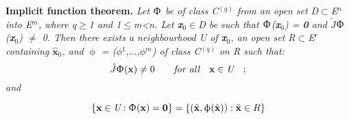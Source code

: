 \documentclass{article}
\theoremstyle{nonumberplain}
\begin{document}
\textbf{Implicit function theorem.} 
\emph{Let \textbf{$\Upphi$} be of class C$^{(q)}$ from an open set D$\subset$E$^n$ into E$^m$, where q$\geq$1 and 1$\leq$m\emph{<}n. Let \textbf{x}$_0$$\in$D be such that 
\textbf{$\Upphi$}\emph{(}\textbf{x}$_0$\emph{)}
\emph{=} \emph{\textbf{0}}
and 
$\tilde{J}$\textbf{$\Upphi$}\emph{(}\textbf{x}$_0$\emph{)}
\emph{$\neq$ 0}.
 Then there exists a neighbourhood U of \textbf{x}$_0$, an open set R$\subset$E$^r$
  containing $\widehat{\textbf{x}}$$_0$, 
  and }\textbf{$\upphi$} 
  \emph{\emph{= (}$\phi$$^1$,$\dotsc$,$\phi$$^m$\emph{)} of class C$^{(q)}$ on R such that:}
$$\tilde{J}\textbf{$\Upphi$}(\textbf{x}) \neq 0  \qquad
\emph{for all}  
\quad\textbf{x}\in\emph{U}\quad; $$
\emph{and}

$$\{\textbf{x}\in\emph{U}:\textbf{$\Upphi$}(\textbf{x}) = \textbf{0}\} = \{(\hat{\textbf{x}},\textbf{$\upphi$}(\hat{\textbf{x}})):\hat{\textbf{x}}\in R\}$$
\end{document}
